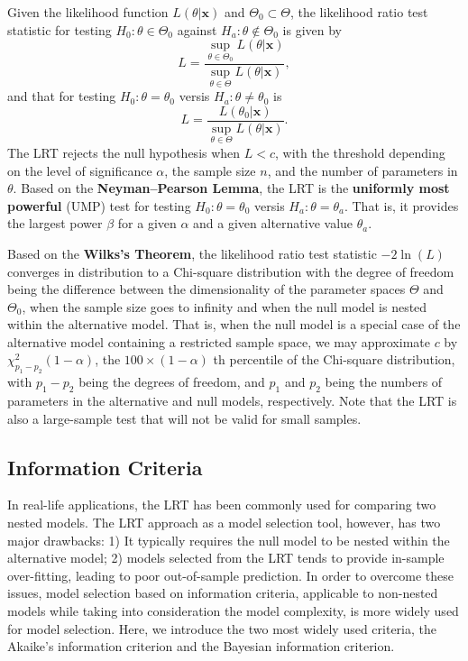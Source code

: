 \documentclass[]{book}
\theoremstyle{definition}
\theoremstyle{definition}
\theoremstyle{definition}
\theoremstyle{remark}
\begin{document}
Given the likelihood function \(L(\theta|\mathbf{x})\) and
\(\Theta_0 \subset \Theta\), the likelihood ratio test statistic for
testing \(H_0:\theta\in\Theta_0\) against \(H_a:\theta\notin\Theta_0\)
is given by
\[L=\frac{\sup_{\theta\in\Theta_0}L(\theta|\mathbf{x})}{\sup_{\theta\in\Theta}L(\theta|\mathbf{x})},\]
and that for testing \(H_0:\theta=\theta_0\) versis
\(H_a:\theta\neq\theta_0\) is
\[L=\frac{L(\theta_0|\mathbf{x})}{\sup_{\theta\in\Theta}L(\theta|\mathbf{x})}.\]
The LRT rejects the null hypothesis when \(L < c\), with the threshold
depending on the level of significance \(\alpha\), the sample size
\(n\), and the number of parameters in \(\theta\). Based on the
\textbf{Neyman--Pearson Lemma}, the LRT is the \textbf{uniformly most
powerful} (UMP) test for testing \(H_0:\theta=\theta_0\) versis
\(H_a:\theta=\theta_a\). That is, it provides the largest power
\(\beta\) for a given \(\alpha\) and a given alternative value
\(\theta_a\).

Based on the \textbf{Wilks's Theorem}, the likelihood ratio test
statistic \(-2\ln(L)\) converges in distribution to a Chi-square
distribution with the degree of freedom being the difference between the
dimensionality of the parameter spaces \(\Theta\) and \(\Theta_0\), when
the sample size goes to infinity and when the null model is nested
within the alternative model. That is, when the null model is a special
case of the alternative model containing a restricted sample space, we
may approximate \(c\) by \(\chi^2_{p_1 - p_2}(1-\alpha)\), the
\(100\times(1-\alpha)\) th percentile of the Chi-square distribution,
with \(p_1-p_2\) being the degrees of freedom, and \(p_1\) and \(p_2\)
being the numbers of parameters in the alternative and null models,
respectively. Note that the LRT is also a large-sample test that will
not be valid for small samples.

\subsection{Information Criteria}\label{S:AppA:HT:IC}

In real-life applications, the LRT has been commonly used for comparing
two nested models. The LRT approach as a model selection tool, however,
has two major drawbacks: 1) It typically requires the null model to be
nested within the alternative model; 2) models selected from the LRT
tends to provide in-sample over-fitting, leading to poor out-of-sample
prediction. In order to overcome these issues, model selection based on
information criteria, applicable to non-nested models while taking into
consideration the model complexity, is more widely used for model
selection. Here, we introduce the two most widely used criteria, the
Akaike's information criterion and the Bayesian information criterion.
\end{document}
